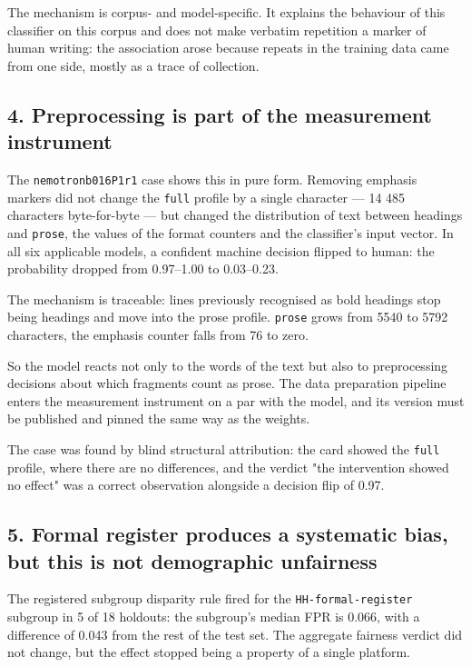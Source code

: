 \documentclass[11pt,a4paper]{article}
\renewcommand{\_}{\textunderscore\allowbreak}
\begin{document}
The mechanism is corpus- and model-specific. It explains the behaviour of this
classifier on this corpus and does not make verbatim repetition a marker of human
writing: the association arose because repeats in the training data came from one
side, mostly as a trace of collection.

\subsection{4. Preprocessing is part of the measurement instrument}

The \texttt{nemotron\_b016\_P1\_r1} case shows this in pure form. Removing emphasis markers
did not change the \texttt{full} profile by a single character — 14 485 characters
byte-for-byte — but changed the distribution of text between headings and
\texttt{prose}, the values of the format counters and the classifier's input vector. In
all six applicable models, a confident machine decision flipped to human: the
probability dropped from 0.97–1.00 to 0.03–0.23.

The mechanism is traceable: lines previously recognised as bold headings stop
being headings and move into the prose profile. \texttt{prose} grows from 5540 to 5792
characters, the emphasis counter falls from 76 to zero.

So the model reacts not only to the words of the text but also to preprocessing
decisions about which fragments count as prose. The data preparation pipeline
enters the measurement instrument on a par with the model, and its version must
be published and pinned the same way as the weights.

The case was found by blind structural attribution: the card showed the \texttt{full}
profile, where there are no differences, and the verdict "the intervention showed
no effect" was a correct observation alongside a decision flip of 0.97.

\subsection{5. Formal register produces a systematic bias, but this is not demographic unfairness}

The registered subgroup disparity rule fired for the \texttt{HH-\allowbreak{}formal-\allowbreak{}register}
subgroup in 5 of 18 holdouts: the subgroup's median FPR is 0.066, with a
difference of 0.043 from the rest of the test set. The aggregate fairness verdict
did not change, but the effect stopped being a property of a single platform.
\end{document}
